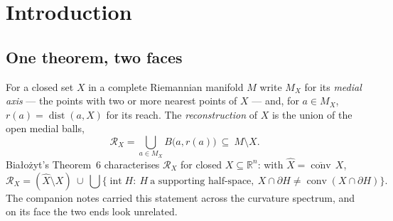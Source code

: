 \documentclass[11pt]{article}
\theoremstyle{remark}
\newcommand{\R}{\mathbb{R}}
\newcommand{\X}{X}
\newcommand{\Xhat}{\widehat{\X}}
\newcommand{\Mx}{M_{\X}}
\newcommand{\Rx}{\mathcal{R}_{\X}}
\newcommand{\dist}{\operatorname{dist}}
\newcommand{\conv}{\operatorname{conv}}
\newcommand{\sect}{\operatorname{sec}}
\newcommand{\Hess}{\operatorname{Hess}}
\newcommand{\HH}{\mathbb{H}}
\newcommand{\Sn}{\mathbb{S}^{n}}
\begin{document}
\begin{abstract}
\begin{itemize}
($\Hess b\preceq0$, no unbounded convex free region by Bonnet--Myers or a
soul, finite centre) collapses detection to a contact count.
\end{itemize}
The two co-vary on the classical models ($\HH^{n}$: non-compact,
$\sect\le0$; $\Sn$: compact, $\sect>0$), which invites their fusion into a
single ``curvature trichotomy''; they \emph{decouple} on an open
$\sect>0$ paraboloid (finite centres, yet \emph{partial}) and on a compact
hyperbolic manifold ($\sect<0$, yet \emph{total}). The reconstructing ball
above zero is moreover \emph{not} convex --- it wraps around past the
convexity radius (radius up to the diameter), which is the mechanism of
totality; the convexity-radius and soul bounds apply to the convex regions
that host the \emph{ideal} centre, hence to the detection flavour, not to
the carrier. The honest structure is therefore a $2\times2$ ---
compactness $\times$ Hessian sign --- with Bia\l{}o\.zyt's theorem the
curvature knife-edge of the detection axis.
\end{abstract}

\tableofcontents

\section{Introduction}\label{sec:intro}

\subsection*{One theorem, two faces}

For a closed set $\X$ in a complete Riemannian manifold $M$ write $\Mx$
for its \emph{medial axis} --- the points with two or more nearest points
of $\X$ --- and, for $a\in\Mx$, $r(a)=\dist(a,\X)$ for its reach. The
\emph{reconstruction} of $\X$ is the union of the open medial balls,
\[
  \Rx=\bigcup_{a\in\Mx}B\!\bigl(a,r(a)\bigr)\ \subseteq\ M\setminus\X .
\]
Bia\l{}o\.zyt's Theorem~6 \cite{Bia} characterises $\Rx$ for closed
$\X\subseteq\R^{n}$: with $\Xhat=\overline{\conv}\,\X$,
\begin{equation}\label{eq:bia}
  \Rx=(\Xhat\setminus\X)\ \cup\
  \bigcup\bigl\{\operatorname{int}H:\ H\ \text{a supporting half-space},\
  \X\cap\partial H\neq\conv(\X\cap\partial H)\bigr\}.
\end{equation}
The companion notes carried this statement across the curvature spectrum,
and on its face the two ends look unrelated.
\end{document}
